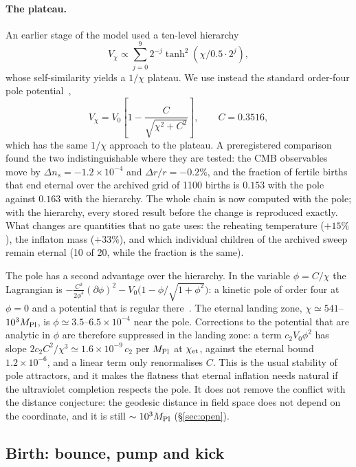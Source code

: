 \documentclass[11pt,a4paper]{article}
\newcommand{\Mpl}{M_{\rm Pl}}
\begin{document}
\paragraph{The plateau.}
An earlier stage of the model used a ten-level hierarchy
\[
V_\chi\propto\sum_{j=0}^{9}2^{-j}\tanh^2(\chi/0.5\cdot2^j),
\]
whose self-similarity yields a $1/\chi$ plateau.
We use instead the standard order-four pole potential~\cite{GKLR2015},
\begin{equation}
V_\chi = V_0\left[1-\frac{C}{\sqrt{\chi^2+C^2}}\right],\qquad C = 0.3516,
\end{equation}
which has the same $1/\chi$ approach to the plateau.
A preregistered comparison found the two indistinguishable where they are tested: the CMB observables move by $\Delta n_s=-1.2\times10^{-4}$ and $\Delta r/r=-0.2\%$, and the fraction of fertile births that end eternal over the archived grid of 1100 births is $0.153$ with the pole against $0.163$ with the hierarchy.
The whole chain is now computed with the pole; with the hierarchy, every stored result before the change is reproduced exactly.
What changes are quantities that no gate uses: the reheating temperature ($+15\%$), the inflaton mass ($+33\%$), and which individual children of the archived sweep remain eternal (10 of 20, while the fraction is the same).

The pole has a second advantage over the hierarchy.
In the variable $\phi=C/\chi$ the Lagrangian is $-\tfrac{C^2}{2\phi^4}(\partial\phi)^2-V_0\big(1-\phi/\sqrt{1+\phi^2}\big)$: a kinetic pole of order four at $\phi=0$ and a potential that is regular there~\cite{GKLR2015}.
The eternal landing zone, $\chi\simeq541$--$10^3\Mpl$, is $\phi\simeq3.5$--$6.5\times10^{-4}$ near the pole.
Corrections to the potential that are analytic in $\phi$ are therefore suppressed in the landing zone: a term $c_2V_0\phi^2$ has slope $2c_2C^2/\chi^3\simeq1.6\times10^{-9}\,c_2$ per $\Mpl$ at $\chi_{\rm et}$, against the eternal bound $1.2\times10^{-6}$, and a linear term only renormalises $C$.
This is the usual stability of pole attractors, and it makes the flatness that eternal inflation needs natural if the ultraviolet completion respects the pole.
It does not remove the conflict with the distance conjecture: the geodesic distance in field space does not depend on the coordinate, and it is still $\sim10^3\Mpl$ (\S\ref{sec:open}).

\subsection{Birth: bounce, pump and kick}
\label{sec:birth}
\end{document}

